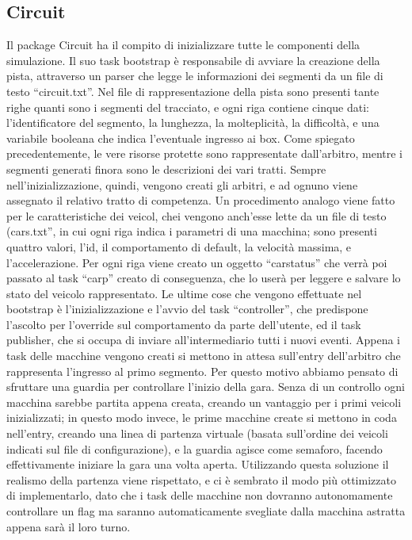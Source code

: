 \subsection{Circuit}

Il package Circuit ha il compito di inizializzare tutte le componenti della simulazione. 
Il suo task bootstrap è responsabile di avviare la creazione della pista, attraverso un parser che legge le informazioni dei segmenti da un file di testo “circuit.txt”. Nel file di rappresentazione della pista sono presenti tante righe quanti sono i segmenti del tracciato, e ogni riga contiene cinque dati: l’identificatore del segmento, la lunghezza, la molteplicità, la difficoltà, e una variabile booleana che indica l’eventuale ingresso ai box.
Come spiegato precedentemente, le vere risorse protette sono rappresentate dall’arbitro, mentre i segmenti generati finora sono le descrizioni dei vari tratti. Sempre nell’inizializzazione, quindi, vengono creati gli arbitri, e ad ognuno viene assegnato il relativo tratto di competenza.
Un procedimento analogo viene fatto per le caratteristiche dei veicol, chei vengono anch’esse lette da un file di testo (cars.txt”, in cui ogni riga indica i parametri di una macchina; sono presenti quattro valori, l’id, il comportamento di default, la velocità massima, e l’accelerazione.
Per ogni riga viene creato un oggetto ``car\textunderscore status'' che verrà poi passato al task ``car\textunderscore p'' creato di conseguenza, che lo userà per leggere e salvare lo stato del veicolo rappresentato.
Le ultime cose che vengono effettuate nel bootstrap è l’inizializzazione e l’avvio del task “controller”, che predispone l’ascolto per l’override sul comportamento da parte dell’utente, ed il task publisher, che si occupa di inviare all’intermediario tutti i nuovi eventi.
Appena i task delle macchine vengono creati si mettono in attesa sull’entry dell’arbitro che rappresenta l’ingresso al primo segmento. Per questo motivo abbiamo pensato di sfruttare una guardia per controllare l’inizio della gara. Senza di un controllo ogni macchina sarebbe partita appena creata, creando un vantaggio per i primi veicoli inizializzati; in questo modo invece, le prime macchine create si mettono in coda nell’entry, creando una linea di partenza virtuale (basata sull’ordine dei veicoli indicati sul file di configurazione), e la guardia agisce come semaforo, facendo effettivamente iniziare la gara una volta aperta. Utilizzando questa soluzione il realismo della partenza viene rispettato, e ci è sembrato il modo più ottimizzato di implementarlo, dato che i task delle macchine non dovranno autonomamente controllare un flag ma saranno automaticamente svegliate dalla macchina astratta appena sarà il loro turno.
